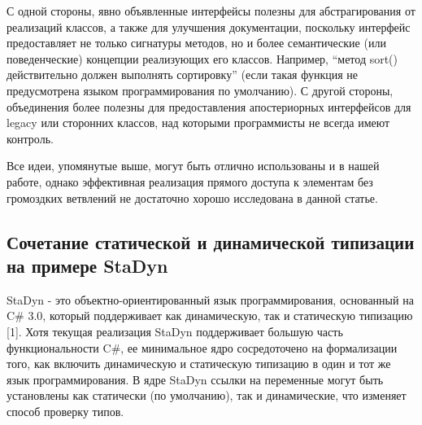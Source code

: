 С одной стороны, явно объявленные интерфейсы полезны для абстрагирования от реализаций классов, а также для улучшения
документации, поскольку интерфейс предоставляет не только сигнатуры методов, но и
более семантические (или поведенческие) концепции реализующих его классов.
Например, “метод sort() действительно должен выполнять сортировку” (если такая функция не предусмотрена
языком программирования по умолчанию).
С другой стороны, объединения более полезны для предоставления апостериорных интерфейсов
для legacy или сторонних классов, над которыми программисты не всегда имеют контроль.

Все идеи, упомянутые выше, могут быть отлично использованы и в нашей работе,
однако эффективная реализация прямого доступа к элементам без громоздких ветвлений не достаточно хорошо
исследована в данной статье.

\subsection{Сочетание статической и динамической типизации на примере StaDyn}

StaDyn - это объектно-ориентированный язык программирования, основанный на C\# 3.0, который поддерживает как динамическую,
так и статическую типизацию [1].
Хотя текущая реализация StaDyn поддерживает большую часть функциональности C\#, ее минимальное ядро сосредоточено на
формализации того, как включить динамическую и статическую типизацию в один и тот же язык программирования.
В ядре StaDyn ссылки на переменные могут быть установлены как статически (по умолчанию), так и динамические, что изменяет
способ проверку типов.

